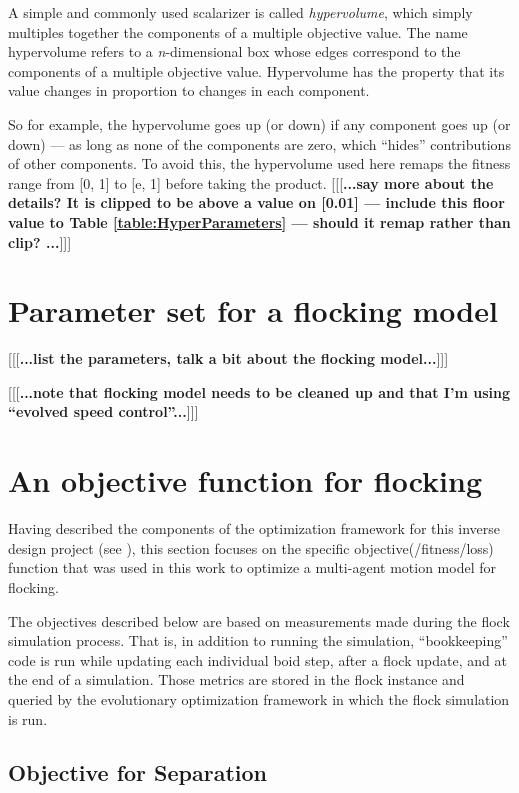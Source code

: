 \documentclass[letterpaper]{article}
\begin{document}
A simple and commonly used scalarizer is called \textit{hypervolume}, which simply multiples together the components of a multiple objective value. The name hypervolume refers to a \textit{n}-dimensional box whose edges correspond to the components of a multiple objective value. Hypervolume has the property that its value changes in proportion to changes in each component.

So for example, the hypervolume goes up (or down) if any component goes up (or down) --- as long as none of the components are zero, which ``hides'' contributions of other components. To avoid this, the hypervolume used here remaps the fitness range from [0, 1] to [e, 1] before taking the product. [[[\textbf{...say more about the details? It is clipped to be above a value on [0.01] --- include this floor value to Table \ref{table:HyperParameters} --- should it remap rather than clip? ...}]]]

\section{Parameter set for a flocking model}
\label{sec:parameter_set}

[[[\textbf{...list the parameters, talk a bit about the flocking model...}]]]

[[[\textbf{...note that flocking model needs to be cleaned up and that I'm using ``evolved speed control''...}]]]

\section{An objective function for flocking}
\label{sec:FlockingObjective}

Having described the components of the optimization framework for this inverse design project (see ), this section focuses on the specific objective(/fitness/loss) function that was used in this work to optimize a multi-agent motion model for flocking.

The objectives described below are based on measurements made during the flock simulation process. That is, in addition to running the simulation, ``bookkeeping'' code is run while updating each individual boid step, after a flock update, and at the end of a simulation. Those metrics are stored in the flock instance and queried by the evolutionary optimization framework in which the flock simulation is run.

\subsection{Objective for Separation}
\label{subsec:separation_objective}
\end{document}
